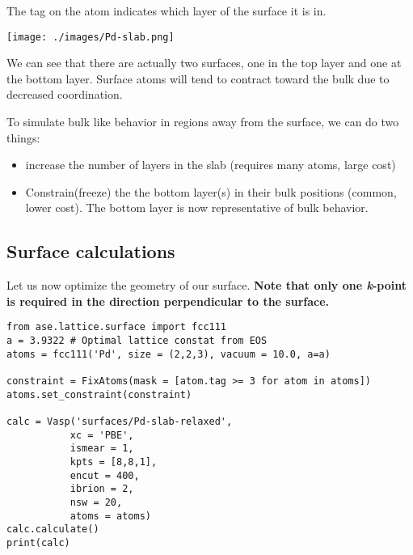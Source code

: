 \documentclass[11pt]{article}
\begin{document}
The tag on the atom indicates which layer of the surface it is in.

\begin{center}
\texttt{[image: ./images/Pd-slab.png]}
\end{center}

We can see that there are actually two surfaces, one in the top layer and one at the bottom layer. Surface atoms will tend to contract toward the bulk due to decreased coordination. 

To simulate bulk like behavior in regions away from the surface, we can do two things:

\begin{itemize}
\item increase the number of layers in the slab (requires many atoms, large cost)

\item Constrain(freeze) the the bottom layer(s) in their bulk positions (common, lower cost). The bottom layer is now representative of bulk behavior.
\end{itemize}


\subsection{Surface calculations}
\label{sec:orgc1e7db6}

Let us now optimize the geometry of our surface. \textbf{Note that only one \emph{k}-point is required in the direction perpendicular to the surface.}

\begin{verbatim}
from ase.lattice.surface import fcc111
a = 3.9322 # Optimal lattice constat from EOS
atoms = fcc111('Pd', size = (2,2,3), vacuum = 10.0, a=a)

constraint = FixAtoms(mask = [atom.tag >= 3 for atom in atoms])
atoms.set_constraint(constraint)

calc = Vasp('surfaces/Pd-slab-relaxed',
           xc = 'PBE',
           ismear = 1,
           kpts = [8,8,1],
           encut = 400,
           ibrion = 2,
           nsw = 20,
           atoms = atoms)
calc.calculate()
print(calc)
\end{verbatim}
\end{document}
